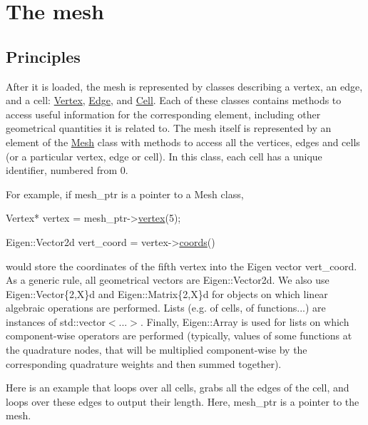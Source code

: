 \label{_mesh}%
 \hypertarget{index_mesh}{}\section{The mesh}\label{index_mesh}
\hypertarget{index_meshpple}{}\subsection{Principles}\label{index_meshpple}
After it is loaded, the mesh is represented by classes describing a vertex, an edge, and a cell\+: \hyperlink{classHArDCore2D_1_1Vertex}{Vertex}, \hyperlink{classHArDCore2D_1_1Edge}{Edge}, and \hyperlink{classHArDCore2D_1_1Cell}{Cell}. Each of these classes contains methods to access useful information for the corresponding element, including other geometrical quantities it is related to. The mesh itself is represented by an element of the \hyperlink{classHArDCore2D_1_1Mesh}{Mesh} class with methods to access all the vertices, edges and cells (or a particular vertex, edge or cell). In this class, each cell has a unique identifier, numbered from 0.

For example, if {\ttfamily mesh\+\_\+ptr} is a pointer to a Mesh class, 
\begin{DoxyCode}
Vertex* vertex = mesh\_ptr->\hyperlink{classHArDCore2D_1_1Mesh_ad099224c697c05a57fad6a47fdcd9e76}{vertex}(5);

Eigen::Vector2d vert\_coord = vertex->\hyperlink{group__Mesh_gade92964c93627c034b021c1d23075a79}{coords}()
\end{DoxyCode}
 would store the coordinates of the fifth vertex into the Eigen vector vert\+\_\+coord. As a generic rule, all geometrical vectors are {\ttfamily Eigen\+::\+Vector2d}. We also use {\ttfamily Eigen\+::\+Vector\{2,X\}d} and {\ttfamily Eigen\+::\+Matrix\{2,X\}d} for objects on which linear algebraic operations are performed. Lists (e.\+g. of cells, of functions...) are instances of {\ttfamily std\+::vector$<$...$>$}. Finally, {\ttfamily Eigen\+::\+Array} is used for lists on which component-\/wise operators are performed (typically, values of some functions at the quadrature nodes, that will be multiplied component-\/wise by the corresponding quadrature weights and then summed together).

Here is an example that loops over all cells, grabs all the edges of the cell, and loops over these edges to output their length. Here, {\ttfamily mesh\+\_\+ptr} is a pointer to the mesh.


